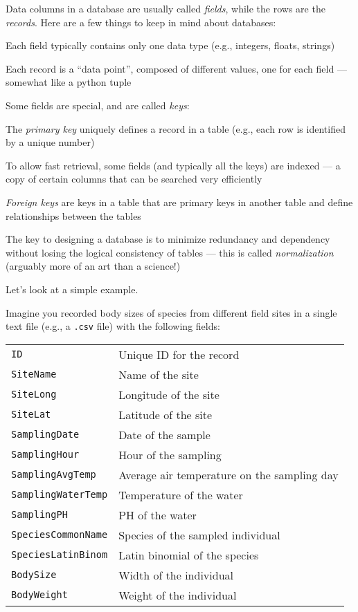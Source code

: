 Data columns in a database are usually called {\it fields}, while the 
rows are the {\it records}. Here are a few things to keep in mind about 
databases:
 \begin{compactitem}
		\item Each field typically contains only one data type (e.g., 
			integers, floats, strings)
		\item Each record is a ``data point'', composed of different 
		values, one for each field --- somewhat like a python tuple
		\item Some fields are special, and are called {\it keys}:
      \begin{compactitem}
				\item The {\it primary key} uniquely defines a record in a 
				table (e.g., each row is identified by a unique number)
				\item To allow fast retrieval, some fields (and typically all the 
				keys) are indexed --- a copy of certain columns that can be searched 
				very efficiently 
				\item {\it Foreign keys} are keys in a table that are primary 
				keys in another table and define relationships between the 
				tables
      \end{compactitem}
		\item The key to designing a database is to minimize redundancy and 
		dependency without losing the logical consistency of tables --- 
		this is called {\it normalization} (arguably more of an art than a 
		science!)
\end{compactitem}

\noindent Let's look at a simple example. 

Imagine you recorded body 
sizes of species from different field sites in a single text file 
(e.g., a {\tt .csv} file) with the following fields:
  
\begin{tabular}{p{4cm} p{8cm}}
		{\tt ID} & Unique ID for the record\\
		{\tt SiteName} & Name of the site\\
	  {\tt SiteLong} & Longitude of the site\\
	  {\tt SiteLat} & Latitude of the site\\
	  {\tt SamplingDate} & Date of the sample\\
	  {\tt SamplingHour} & Hour of the sampling\\
	  {\tt SamplingAvgTemp} & Average air temperature on the sampling day\\
	  {\tt SamplingWaterTemp} & Temperature of the water\\
	  {\tt SamplingPH} & PH of the water\\
	  {\tt SpeciesCommonName} & Species of the sampled individual\\
	  {\tt SpeciesLatinBinom} & Latin binomial of the species\\
	  {\tt BodySize} & Width of the individual\\
	  {\tt BodyWeight} & Weight of the individual\\
\end{tabular}\\
  
